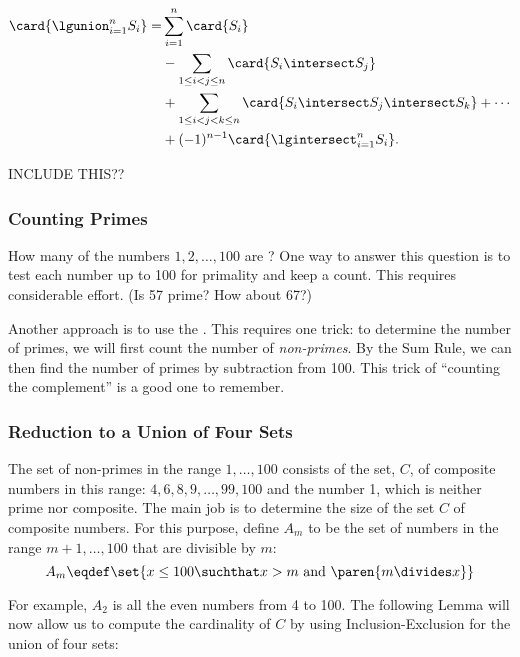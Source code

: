 \begin{mathrule*}
\begin{align*}
\card{\lgunion_{i=1}^n S_i} 
   = & \sum_{i=1}^n \card{S_i}\\
     & - \sum_{1\leq i < j \leq n} \card{S_i \intersect S_j}\\
     &  + \sum_{1\leq i < j < k \leq n} \card{S_i \intersect S_j
       \intersect S_k} + \cdots\\
     & + (-1)^{n-1} \card{\lgintersect_{i=1}^n S_i}.
\end{align*}
\end{mathrule*}

\iffalse  INCLUDE THIS??

\subsubsection{Counting Primes}

How many of the numbers $1, 2, \dots, 100$ are ?  One way to
answer this question is to test each number up to 100 for primality and
keep a count.  This requires considerable effort.  (Is 57 prime?  How
about 67?)

Another approach is to use the .  This
requires one trick: to determine the number of primes, we will first count
the number of {\em non-primes}.  By the Sum Rule, we can then find the
number of primes by subtraction from 100.  This trick of ``counting the
complement'' is a good one to remember.

\subsubsection*{Reduction to a Union of Four Sets}

The set of non-primes in the range $1, \dots, 100$ consists of the set,
$C$, of composite numbers in this range: $4, 6, 8, 9, \dots, 99, 100$ and
the number 1, which is neither prime nor composite.  The main job is to
determine the size of the set $C$ of composite numbers.  For this purpose,
define $A_m$ to be the set of numbers in the range $m+1, \dots, 100$ that
are divisible by $m$:
\[
A_m \eqdef \set{x \leq 100 \suchthat x > m \text{ and } \paren{m \divides x}}
\]

For example, $A_2$ is all the even numbers from 4 to 100.  The following
Lemma will now allow us to compute the cardinality of $C$ by using
Inclusion-Exclusion for the union of four sets:


